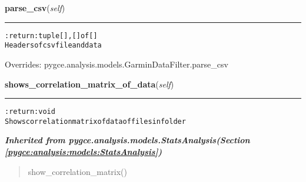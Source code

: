     \vspace{0.5ex}

\hspace{.8\funcindent}\begin{boxedminipage}{\funcwidth}

    \raggedright \textbf{parse\_csv}(\textit{self})

    \vspace{-1.5ex}

    \rule{\textwidth}{0.5\fboxrule}
\setlength{\parskip}{2ex}
\begin{alltt}

:return: tuple [], [] of []
    Headers of csv file and data
\end{alltt}

\setlength{\parskip}{1ex}
      Overrides: pygce.analysis.models.GarminDataFilter.parse\_csv

    \end{boxedminipage}

    \label{pygce:analysis:models:ActivitiesDataAnalysis:shows_correlation_matrix_of_data}

    \vspace{0.5ex}

\hspace{.8\funcindent}\begin{boxedminipage}{\funcwidth}

    \raggedright \textbf{shows\_correlation\_matrix\_of\_data}(\textit{self})

    \vspace{-1.5ex}

    \rule{\textwidth}{0.5\fboxrule}
\setlength{\parskip}{2ex}
\begin{alltt}

:return: void
    Shows correlation matrix of data of files in folder
\end{alltt}

\setlength{\parskip}{1ex}
    \end{boxedminipage}


\large{\textbf{\textit{Inherited from pygce.analysis.models.StatsAnalysis\textit{(Section \ref{pygce:analysis:models:StatsAnalysis})}}}}

\begin{quote}
show\_correlation\_matrix()
\end{quote}

